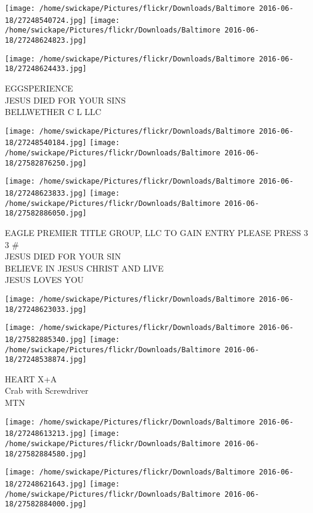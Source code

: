 \documentclass[10pt,letterpaper]{article}
\begin{document}
\texttt{[image: /home/swickape/Pictures/flickr/Downloads/Baltimore 2016-06-18/27248540724.jpg]}
\texttt{[image: /home/swickape/Pictures/flickr/Downloads/Baltimore 2016-06-18/27248624823.jpg]}

\vspace{0.25in}
\texttt{[image: /home/swickape/Pictures/flickr/Downloads/Baltimore 2016-06-18/27248624433.jpg]}

EGGSPERIENCE\\
JESUS DIED FOR YOUR SINS\\
BELLWETHER C L LLC\\
\pagebreak

\texttt{[image: /home/swickape/Pictures/flickr/Downloads/Baltimore 2016-06-18/27248540184.jpg]}
\texttt{[image: /home/swickape/Pictures/flickr/Downloads/Baltimore 2016-06-18/27582876250.jpg]}

\texttt{[image: /home/swickape/Pictures/flickr/Downloads/Baltimore 2016-06-18/27248623833.jpg]}
\texttt{[image: /home/swickape/Pictures/flickr/Downloads/Baltimore 2016-06-18/27582886050.jpg]}

EAGLE PREMIER TITLE GROUP, LLC TO GAIN ENTRY PLEASE PRESS 3 3 \#\\
JESUS DIED FOR YOUR SIN\\
BELIEVE IN JESUS CHRIST AND LIVE\\
JESUS LOVES YOU\\
\pagebreak

\texttt{[image: /home/swickape/Pictures/flickr/Downloads/Baltimore 2016-06-18/27248623033.jpg]}

\vspace{0.25in}
\texttt{[image: /home/swickape/Pictures/flickr/Downloads/Baltimore 2016-06-18/27582885340.jpg]}
\texttt{[image: /home/swickape/Pictures/flickr/Downloads/Baltimore 2016-06-18/27248538874.jpg]}

HEART X+A\\
Crab with Screwdriver\\
MTN\\
\pagebreak

\texttt{[image: /home/swickape/Pictures/flickr/Downloads/Baltimore 2016-06-18/27248613213.jpg]}
\texttt{[image: /home/swickape/Pictures/flickr/Downloads/Baltimore 2016-06-18/27582884580.jpg]}

\texttt{[image: /home/swickape/Pictures/flickr/Downloads/Baltimore 2016-06-18/27248621643.jpg]}
\texttt{[image: /home/swickape/Pictures/flickr/Downloads/Baltimore 2016-06-18/27582884000.jpg]}
\end{document}
